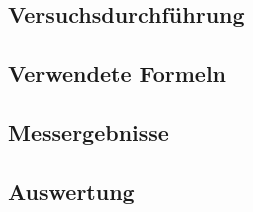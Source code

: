 \documentclass[12pt,a4paper]{article}
\begin{document}
\subsection{Versuchsdurchführung}
\subsection{Verwendete Formeln}
\subsection{Messergebnisse}
\subsection{Auswertung}
\end{document}
